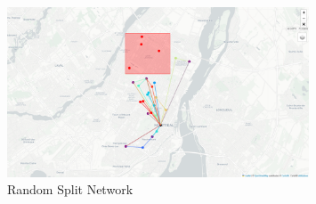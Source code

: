 \documentclass[12pt]{article}
\begin{document}
\begin{appendices}
    \begin{figure}[h]
        \centering
        \includegraphics[width=0.8\textwidth]{random-network.png}
        \caption{Random Split Network}
        \label{fig:random-network}
    \end{figure}

\end{appendices}
\end{document}
